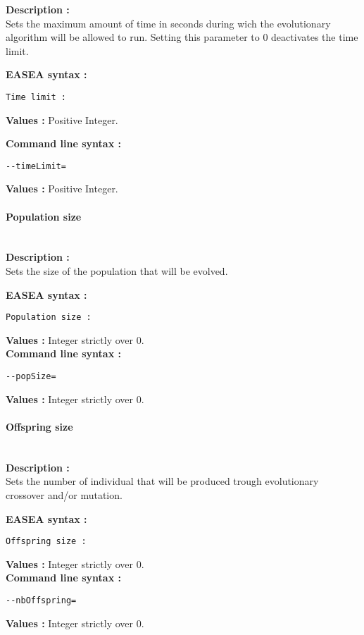\documentclass{book}
\begin{document}
\textbf{Description :}\\Sets the maximum amount of time in seconds
during wich the evolutionary algorithm will be allowed to run. Setting
this parameter to 0 deactivates the time limit.

\textbf{EASEA syntax :}

\texttt{Time~limit~:}

\textbf{Values :} Positive Integer.

\textbf{Command line syntax :}

\texttt{-{}-timeLimit=}

\textbf{Values :} Positive Integer.

\paragraph{Population size}\label{population-size}
~\\

\textbf{Description :}\\Sets the size of the population that will be
evolved.

\textbf{EASEA syntax :}

\texttt{Population~size~:}

\textbf{Values :} Integer strictly over 0.\\ \textbf{Command line syntax
:}

\texttt{-{}-popSize=}

\textbf{Values :} Integer strictly over 0.\\

\paragraph{Offspring size}\label{offspring-size}
~\\

\textbf{Description :}\\Sets the number of individual that will be
produced trough evolutionary crossover and/or mutation.

\textbf{EASEA syntax :}

\texttt{Offspring~size~:}

\textbf{Values :} Integer strictly over 0.\\ \textbf{Command line syntax
:}

\texttt{-{}-nbOffspring=}

\textbf{Values :} Integer strictly over 0.\\
\end{document}
